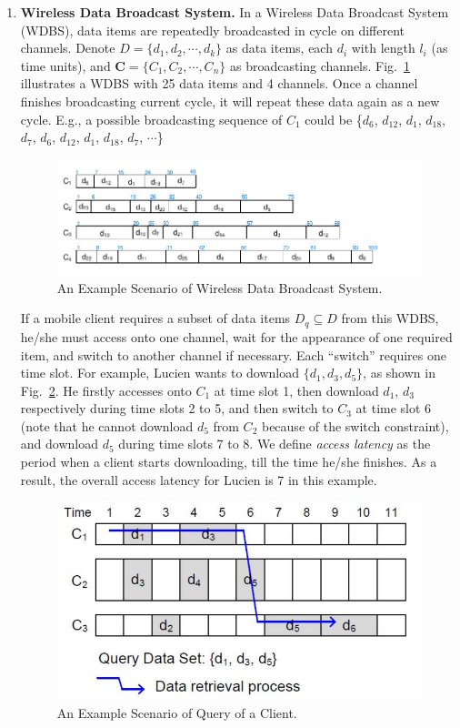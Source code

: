 \documentclass[12pt,a4paper]{article}
\theoremstyle{definition}
\begin{document}
\begin{enumerate}
\item \textbf{Wireless Data Broadcast System.}
In a Wireless Data Broadcast System (WDBS), data items are repeatedly broadcasted in cycle on different channels. Denote $D = \{d_1, d_2,\cdots, d_k\}$ as data items, each $d_i$ with length $l_i$ (as time units), and $\mathbf{C}=\{C_1, C_2, \cdots, C_n\}$ as broadcasting channels. Fig.~\ref{Fig-Broadcast} illustrates a WDBS with 25 data items and 4 channels. Once a channel finishes broadcasting current cycle, it will repeat these data again as a new cycle. E.g., a possible broadcasting sequence of $C_1$ could be \{$d_6$, $d_{12}$, $d_1$, $d_{18}$, $d_7$, $d_6$, $d_{12}$, $d_1$, $d_{18}$, $d_7$, $\cdots$\}

\begin{figure}[h]
	\centering
	\includegraphics[scale=1]{Fig-Broadcast.pdf}
	\caption{An Example Scenario of Wireless Data Broadcast System.} \label{Fig-Broadcast}
\end{figure}

If a mobile client requires a subset of data items $D_q \subseteq D$ from this WDBS, he/she must access onto one channel, wait for the appearance of one required item, and switch to another channel if necessary. Each ``switch'' requires one time slot. For example, Lucien wants to download $\{d_1, d_3, d_5\}$, as shown in Fig.~\ref{Fig-Access}. He firstly accesses onto $C_1$ at time slot 1, then download $d_1$, $d_3$ respectively during time slots 2 to 5, and then switch to $C_3$ at time slot 6 (note that he cannot download $d_5$ from $C_2$ because of the switch constraint), and download $d_5$ during time slots 7 to 8. We define \emph{access latency} as the period when a client starts downloading, till the time he/she finishes. As a result, the overall access latency for Lucien is 7 in this example.

\begin{figure}[!htbp]
	\centering
	\includegraphics[scale= 0.5]{Fig-Access.pdf}
	\caption{An Example Scenario of Query of a Client.} \label{Fig-Access}
\end{figure}


\end{enumerate}
\end{document}
